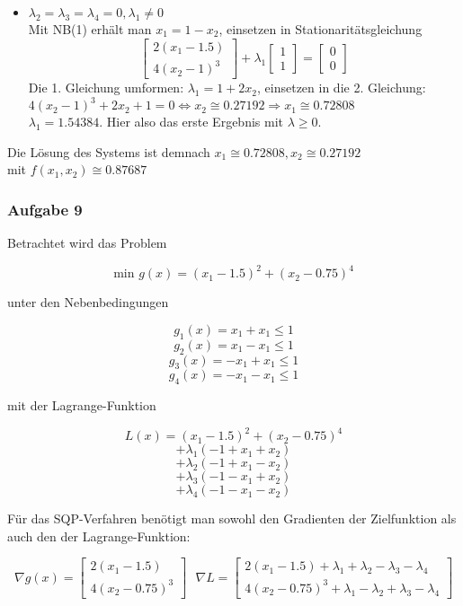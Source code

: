 \documentclass[a4paper, 12pt]{report}
\begin{document}
\begin{itemize}
  \item $\lambda_2 = \lambda_3 = \lambda_4 = 0, \lambda_1 \neq 0$\\
  Mit NB(1) erhält man $x_1 = 1 - x_2$, einsetzen in Stationaritätsgleichung
  $$\begin{bmatrix}2(x_1 - 1.5)\\4(x_2 -1)^3\end{bmatrix} + \lambda_1 \begin{bmatrix}1\\1\end{bmatrix} = \begin{bmatrix}0\\0\end{bmatrix}$$
  Die 1. Gleichung umformen: $\lambda_1 = 1 + 2x_2$, einsetzen in die 2. Gleichung:\\
  $4(x_2 - 1)^3 + 2x_2 + 1 = 0 \Leftrightarrow x_2 \cong 0.27192 \Rightarrow x_1 \cong 0.72808$\\
  $\lambda_1 = 1.54384$. Hier also das erste Ergebnis mit $\lambda \geq 0$.

\end{itemize}

Die Lösung des Systems ist demnach $x_1 \cong 0.72808, x_2 \cong 0.27192$\\
mit $f(x_1, x_2) \cong 0.87687$

\subsubsection{Aufgabe 9}
Betrachtet wird das Problem

$$\text{min } g(x) = (x_1 - 1.5)^2 + (x_2 - 0.75)^4$$

unter den Nebenbedingungen

$$g_1(x) = x_1 + x_1 \leq 1$$
$$g_2(x) = x_1 - x_1 \leq 1$$
$$g_3(x) = -x_1 + x_1 \leq 1$$
$$g_4(x) = -x_1 - x_1 \leq 1$$

mit der Lagrange-Funktion

$$L(x) = (x_1 - 1.5)^2 + (x_2 - 0.75)^4$$
$$+\lambda_1(-1 + x_1 + x_2)$$
$$+\lambda_2(-1 + x_1 - x_2)$$
$$+\lambda_3(-1-x_1+x_2)$$
$$+\lambda_4(-1-x_1-x_2)$$

Für das SQP-Verfahren benötigt man sowohl den Gradienten der Zielfunktion als auch den der Lagrange-Funktion:

$$\nabla g(x) = \begin{bmatrix}2(x_1 - 1.5)\\4(x_2 - 0.75)^3\end{bmatrix} \text{  } \nabla L = \begin{bmatrix}2(x_1 - 1.5) + \lambda_1 + \lambda_2 - \lambda_3 - \lambda_4\\4(x_2 - 0.75)^3 + \lambda_1 - \lambda_2 + \lambda_3 - \lambda_4\end{bmatrix}$$
\end{document}
